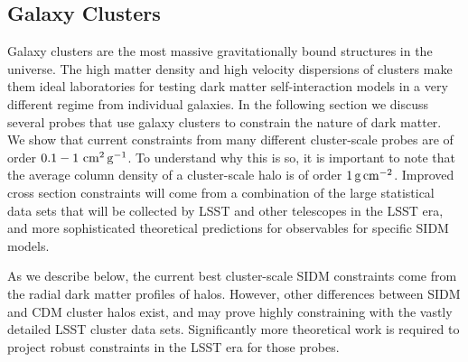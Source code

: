 \subsection{Galaxy Clusters }
\label{sec:halo_profile_clusters}

Galaxy clusters are the most massive gravitationally bound structures in the universe. The high matter density and high velocity dispersions of clusters make them ideal laboratories for testing dark matter self-interaction models in a very different regime from individual galaxies.
In the following section we discuss several probes that use galaxy clusters to constrain the nature of dark matter.  We show that current constraints from many different cluster-scale probes are of order $0.1 - 1\mathrm{\,\mathrm{\,cm}^2\mathrm{\,g}^{-1}}$.  To understand why this is so, it is important to note that the average column density of a cluster-scale halo is of order $1 \mathrm{\,g} \mathrm{\,cm}^{-2}$.  Improved cross section constraints will come from a combination of the large statistical data sets that will be collected by LSST and other telescopes in the LSST era, and more sophisticated theoretical predictions for observables for specific SIDM models.

\vspace{1em} 

As we describe below, the current best cluster-scale SIDM constraints come from the radial dark matter profiles of halos.  However, other differences between SIDM and CDM cluster halos exist, and may prove highly constraining with the vastly detailed LSST cluster data sets.  Significantly more theoretical work is required to project robust constraints in the LSST era for those probes.

